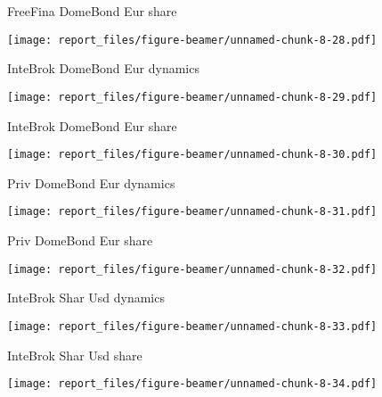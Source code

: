 \documentclass[ignorenonframetext,]{beamer}
\begin{document}
\begin{frame}{FreeFina DomeBond Eur share}
\protect\hypertarget{freefina-domebond-eur-share}{}

\texttt{[image: report\_files/figure-beamer/unnamed-chunk-8-28.pdf]}

\end{frame}

\begin{frame}{InteBrok DomeBond Eur dynamics}
\protect\hypertarget{intebrok-domebond-eur-dynamics}{}

\texttt{[image: report\_files/figure-beamer/unnamed-chunk-8-29.pdf]}

\end{frame}

\begin{frame}{InteBrok DomeBond Eur share}
\protect\hypertarget{intebrok-domebond-eur-share}{}

\texttt{[image: report\_files/figure-beamer/unnamed-chunk-8-30.pdf]}

\end{frame}

\begin{frame}{Priv DomeBond Eur dynamics}
\protect\hypertarget{priv-domebond-eur-dynamics}{}

\texttt{[image: report\_files/figure-beamer/unnamed-chunk-8-31.pdf]}

\end{frame}

\begin{frame}{Priv DomeBond Eur share}
\protect\hypertarget{priv-domebond-eur-share}{}

\texttt{[image: report\_files/figure-beamer/unnamed-chunk-8-32.pdf]}

\end{frame}

\begin{frame}{InteBrok Shar Usd dynamics}
\protect\hypertarget{intebrok-shar-usd-dynamics}{}

\texttt{[image: report\_files/figure-beamer/unnamed-chunk-8-33.pdf]}

\end{frame}

\begin{frame}{InteBrok Shar Usd share}
\protect\hypertarget{intebrok-shar-usd-share}{}

\texttt{[image: report\_files/figure-beamer/unnamed-chunk-8-34.pdf]}

\end{frame}
\end{document}
